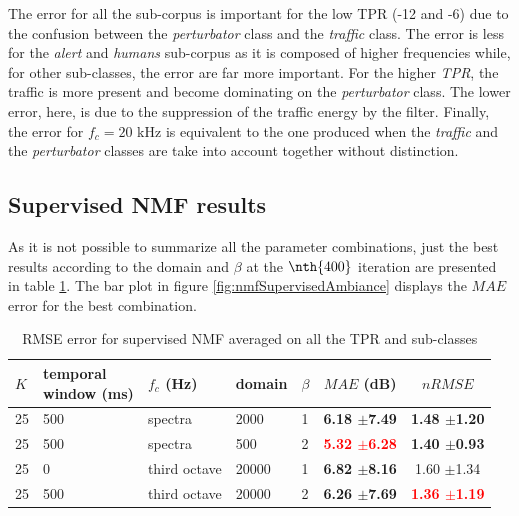 \documentclass[twocolumn,a4paper,10pt]{article}
\begin{document}
The error for all the sub-corpus is important for the low TPR (-12 and -6) due to the confusion between the \textit{perturbator} class and the \textit{traffic} class. The error is less for the \textit{alert} and \textit{humans} sub-corpus as it is composed of higher frequencies while, for other sub-classes, the error are far more important. For the higher \textit{TPR}, the traffic is more present and become dominating on the \textit{perturbator} class. The lower error, here, is due to the suppression of the traffic energy by the filter. Finally, the error for $f_c = 20$ kHz is equivalent to the one produced when the \textit{traffic} and the \textit{perturbator} classes are take into account together without distinction.

\subsection{Supervised NMF results}

As it is not possible to summarize all the parameter combinations, just the best results according to the domain and $\beta$ at the $\nth{400}$ iteration are presented in table \ref{tab:results_supervised}. The bar plot in figure \ref{fig:nmfSupervisedAmbiance} displays the $MAE$ error for the best combination.\\

\begin{table}[t]
\centering
\begin{tabular}{lllllcc}
$K$ & \shortstack{temporal\\window (ms)} & $f_c$ (Hz) & domain & $\beta$ & $MAE$ (dB) & $nRMSE$ \\
\hline
 25 & 500 & spectra &  2000 & 1 & \textbf{6.18 $\pm$7.49} & \textbf{1.48 $\pm$1.20} \\
 25 & 500 & spectra &   500 & 2 & \textbf{\textcolor{red}{5.32 $\pm$6.28}} & \textbf{1.40 $\pm$0.93} \\
 25 & 0 & third octave & 20000 & 1 & \textbf{6.82 $\pm$8.16} & 1.60 $\pm$1.34\\
 25 & 500 & third octave & 20000 & 2 & \textbf{6.26 $\pm$7.69} & \textbf{\textcolor{red}{1.36 $\pm$1.19}} \\
\end{tabular}
\caption{RMSE error for supervised NMF averaged on all the TPR and sub-classes}
\label{tab:results_supervised}
\end{table}
\end{document}
